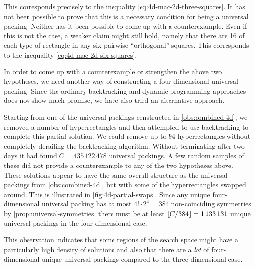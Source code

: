 \noindent This corresponds precisely to the inequality \eqref{eq:4d-mac-2d-three-squares}. It has not been possible to prove that this is a necessary condition for being a universal packing. Neither has it been possible to come up with a counterexample. Even if this is not the case, a weaker claim might still hold, namely that there are 16 of each type of rectangle in any six pairwise ``orthogonal'' squares. This corresponds to the inequality \eqref{eq:4d-mac-2d-six-squares}.

In order to come up with a counterexample or strengthen the above two hypotheses, we need another way of constructing a four-dimensional universal packing. Since the ordinary backtracking and dynamic programming approaches does not show much promise, we have also tried an alternative approach.

\begin{observation}
Starting from one of the universal packings constructed in \cref{obs:combined-4d}, we removed a number of hyperrectangles and then attempted to use backtracking to complete this partial solution. We could remove up to 94 hyperrectangles without completely derailing the backtracking algorithm. Without terminating after two days it had found $C = 435\,122\,478$ universal packings. A few random samples of these did not provide a counterexample to any of the two hypotheses above. These solutions appear to have the same overall structure as the universal packings from \cref{obs:combined-4d}, but with some of the hyperrectangles swapped around. This is illustrated in \cref{fig:4d-partial-swaps}. Since any unique four-dimensional universal packing has at most $4! \cdot 2^4 = 384$ non-coinciding symmetries by \cref{prop:universal-symmetries} there must be at least $\floor*{C/384} = 1\,133\,131$ unique universal packings in the four-dimensional case.
\end{observation}



\noindent This observation indicates that some regions of the search space might have a particularly high density of solutions and also that there are a \textit{lot} of four-dimensional unique universal packings compared to the three-dimensional case.

